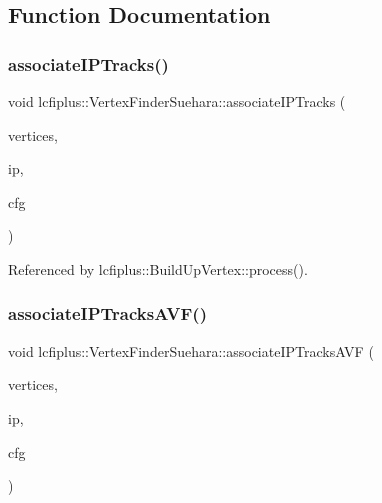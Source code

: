 \subsection{Function Documentation}
\mbox{\label{namespacelcfiplus_1_1VertexFinderSuehara_a562ea1e9b2371041758066a89b975319}} 
\subsubsection{associate\+I\+P\+Tracks()}
{\footnotesize\ttfamily void lcfiplus\+::\+Vertex\+Finder\+Suehara\+::associate\+I\+P\+Tracks (\begin{DoxyParamCaption}\item[{vector$<$ \textbf{ Vertex} $\ast$$>$ \&}]{vertices,  }\item[{\textbf{ Vertex} $\ast$}]{ip,  }\item[{\textbf{ Vertex\+Finder\+Suehara\+Config} \&}]{cfg }\end{DoxyParamCaption})}



Referenced by lcfiplus\+::\+Build\+Up\+Vertex\+::process().

\mbox{\label{namespacelcfiplus_1_1VertexFinderSuehara_a2adbe91b995f9a959364570bba86e3be}} 
\subsubsection{associate\+I\+P\+Tracks\+A\+V\+F()}
{\footnotesize\ttfamily void lcfiplus\+::\+Vertex\+Finder\+Suehara\+::associate\+I\+P\+Tracks\+A\+VF (\begin{DoxyParamCaption}\item[{vector$<$ \textbf{ Vertex} $\ast$$>$ \&}]{vertices,  }\item[{\textbf{ Vertex} $\ast$}]{ip,  }\item[{\textbf{ Vertex\+Finder\+Suehara\+Config} \&}]{cfg }\end{DoxyParamCaption})}



